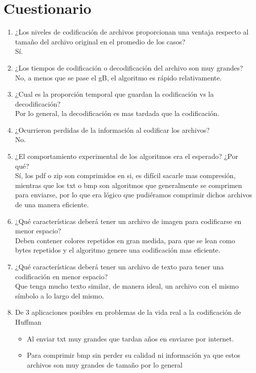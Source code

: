 \documentclass[12 pt]{report}
\begin{document}
\section{Cuestionario}
\begin{enumerate}
\item ¿Los niveles de codificación de archivos proporcionan una ventaja respecto al tamaño del archivo original en el promedio de los casos?\\
  Sí.
\item ¿Los tiempos de codificación o decodificación del archivo son muy grandes?\\
  No, a menos que se pase el gB, el algoritmo es rápido relativamente.
\item ¿Cual es la proporción temporal que guardan la codificación vs la decodificación?\\
  Por lo general, la decodificación es mas tardada que la codificación.
\item ¿Ocurrieron perdidas de la información al codificar los archivos?\\
  No.
\item ¿El comportamiento experimental de los algoritmos era el esperado? ¿Por qué?\\
  Sí, los pdf o zip son comprimidos en si, es difícil sacarle mas compresión, mientras que los txt o bmp son algoritmos que generalmente se comprimen para enviarse, por lo que era lógico que pudiéramos comprimir dichos archivos de una manera eficiente.
\item ¿Qué características deberá tener un archivo de imagen para codificarse en menor espacio?\\
  Deben contener colores repetidos en gran medida, para que se lean como bytes repetidos y el algoritmo genere una codificación mas eficiente.
\item ¿Qué características deberá tener un archivo de texto para tener una codificación en menor espacio?\\
  Que tenga mucho texto similar, de manera ideal, un archivo con el mismo símbolo a lo largo del mismo.
\item De 3 aplicaciones posibles en problemas de la vida real a la codificación de Huffman\\
  \begin{itemize}
  \item Al enviar txt muy grandes que tardan años en enviarse por internet.
  \item Para comprimir bmp sin perder su calidad ni información ya que estos archivos son muy grandes de tamaño por lo general

\end{itemize}
\end{enumerate}
\end{document}
